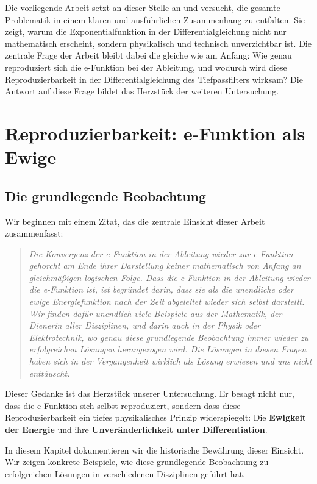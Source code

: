 \documentclass[a4paper, 12pt, twoside, openright]{report}
\theoremstyle{definition}
\theoremstyle{definition}
\begin{document}
Die vorliegende Arbeit setzt an dieser Stelle an und versucht, die gesamte Problematik in einem klaren und ausführlichen Zusammenhang zu entfalten. Sie zeigt, warum die Exponentialfunktion in der Differentialgleichung nicht nur mathematisch erscheint, sondern physikalisch und technisch unverzichtbar ist. Die zentrale Frage der Arbeit bleibt dabei die gleiche wie am Anfang: Wie genau reproduziert sich die e-Funktion bei der Ableitung, und wodurch wird diese Reproduzierbarkeit in der Differentialgleichung des Tiefpassfilters wirksam? Die Antwort auf diese Frage bildet das Herzstück der weiteren Untersuchung.
\section{Reproduzierbarkeit: e-Funktion als Ewige}

\subsection{Die grundlegende Beobachtung}

Wir beginnen mit einem Zitat, das die zentrale Einsicht dieser Arbeit zusammenfasst:

\begin{quote}
\textit{Die Konvergenz der e-Funktion in der Ableitung wieder zur e-Funktion gehorcht am Ende ihrer Darstellung keiner mathematisch von Anfang an gleichmäßigen logischen Folge. Dass die e-Funktion in der Ableitung wieder die e-Funktion ist, ist begründet darin, dass sie als die unendliche oder ewige Energiefunktion nach der Zeit abgeleitet wieder sich selbst darstellt. Wir finden dafür unendlich viele Beispiele aus der Mathematik, der Dienerin aller Disziplinen, und darin auch in der Physik oder Elektrotechnik, wo genau diese grundlegende Beobachtung immer wieder zu erfolgreichen Lösungen herangezogen wird. Die Lösungen in diesen Fragen haben sich in der Vergangenheit wirklich als Lösung erwiesen und uns nicht enttäuscht.}
\end{quote}

Dieser Gedanke ist das Herzstück unserer Untersuchung. Er besagt nicht nur, dass die e-Funktion sich selbst reproduziert, sondern dass diese Reproduzierbarkeit ein tiefes physikalisches Prinzip widerspiegelt: Die \textbf{Ewigkeit der Energie} und ihre \textbf{Unveränderlichkeit unter Differentiation}.

In diesem Kapitel dokumentieren wir die historische Bewährung dieser Einsicht. Wir zeigen konkrete Beispiele, wie diese grundlegende Beobachtung zu erfolgreichen Lösungen in verschiedenen Disziplinen geführt hat.
\end{document}
